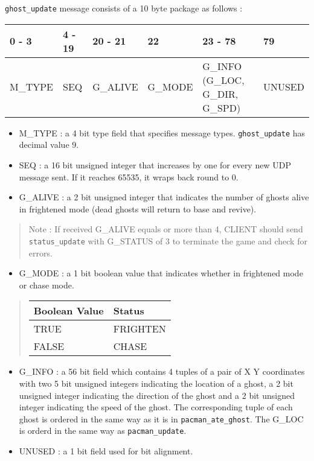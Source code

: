 \documentclass[]{article}
\providecommand{\tightlist}{%
  \setlength{\itemsep}{0pt}\setlength{\parskip}{0pt}}
\begin{document}
\texttt{ghost\_update} message consists of a 10 byte package as follows
:

\begin{longtable}[]{@{}llllll@{}}
\toprule
0 - 3 & 4 - 19 & 20 - 21 & 22 & 23 - 78 & 79\tabularnewline
\midrule
\endhead
M\_TYPE & SEQ & G\_ALIVE & G\_MODE & G\_INFO (G\_LOC, G\_DIR, G\_SPD) &
UNUSED\tabularnewline
\bottomrule
\end{longtable}

\begin{itemize}
\item
  M\_TYPE : a 4 bit type field that specifies message types.
  \texttt{ghost\_update} has decimal value 9.
\item
  SEQ : a 16 bit unsigned integer that increases by one for every new
  UDP message sent. If it reaches 65535, it wraps back round to 0.
\item
  G\_ALIVE : a 2 bit unsigned integer that indicates the number of
  ghosts alive in frightened mode (dead ghosts will return to base and
  revive).
\end{itemize}

\begin{quote}
Note : If received G\_ALIVE equals or more than 4, CLIENT should send
\texttt{status\_update} with G\_STATUS of 3 to terminate the game and
check for errors.
\end{quote}

\begin{itemize}
\tightlist
\item
  G\_MODE : a 1 bit boolean value that indicates whether in frightened
  mode or chase mode.
\end{itemize}

\begin{quote}
\begin{longtable}[]{@{}ll@{}}
\toprule
Boolean Value & Status\tabularnewline
\midrule
\endhead
TRUE & FRIGHTEN\tabularnewline
FALSE & CHASE\tabularnewline
\bottomrule
\end{longtable}
\end{quote}

\begin{itemize}
\item
  G\_INFO : a 56 bit field which contains 4 tuples of a pair of X Y
  coordinates with two 5 bit unsigned integers indicating the location
  of a ghost, a 2 bit unsigned integer indicating the direction of the
  ghost and a 2 bit unsigned integer indicating the speed of the ghost.
  The corresponding tuple of each ghost is ordered in the same way as it
  is in \texttt{pacman\_ate\_ghost}. The G\_LOC is orderd in the same
  way as \texttt{pacman\_update}.
\item
  UNUSED : a 1 bit field used for bit alignment.
\end{itemize}
\end{document}
